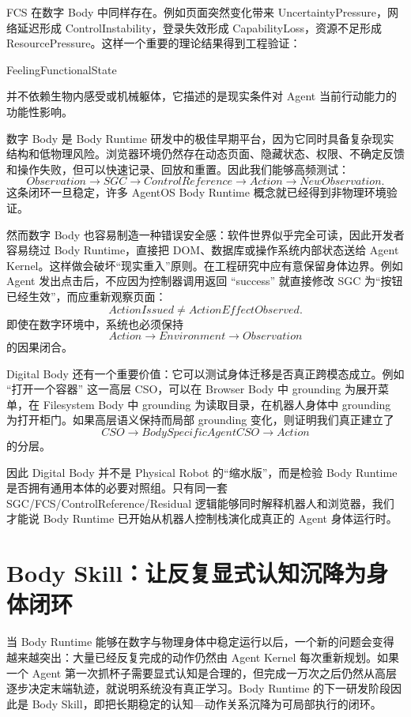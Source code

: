 FCS 在数字 Body 中同样存在。例如页面突然变化带来 UncertaintyPressure，网络延迟形成 ControlInstability，登录失效形成 CapabilityLoss，资源不足形成 ResourcePressure。这样一个重要的理论结果得到工程验证：
\begin{statementbox}
FeelingFunctionalState
\end{statementbox}
并不依赖生物内感受或机械躯体，它描述的是现实条件对 Agent 当前行动能力的功能性影响。

数字 Body 是 Body Runtime 研发中的极佳早期平台，因为它同时具备复杂现实结构和低物理风险。浏览器环境仍然存在动态页面、隐藏状态、权限、不确定反馈和操作失败，但可以快速记录、回放和重置。因此我们能够高频测试：
\[
Observation
\rightarrow
SGC
\rightarrow
ControlReference
\rightarrow
Action
\rightarrow
NewObservation.
\]
这条闭环一旦稳定，许多 AgentOS Body Runtime 概念就已经得到非物理环境验证。

然而数字 Body 也容易制造一种错误安全感：软件世界似乎完全可读，因此开发者容易绕过 Body Runtime，直接把 DOM、数据库或操作系统内部状态送给 Agent Kernel。这样做会破坏“现实重入”原则。在工程研究中应有意保留身体边界。例如 Agent 发出点击后，不应因为控制器调用返回 ``success'' 就直接修改 SGC 为“按钮已经生效”，而应重新观察页面：
\[
ActionIssued
\neq
ActionEffectObserved.
\]
即使在数字环境中，系统也必须保持
\[
Action
\rightarrow
Environment
\rightarrow
Observation
\]
的因果闭合。

Digital Body 还有一个重要价值：它可以测试身体迁移是否真正跨模态成立。例如 ``打开一个容器'' 这一高层 CSO，可以在 Browser Body 中 grounding 为展开菜单，在 Filesystem Body 中 grounding 为读取目录，在机器人身体中 grounding 为打开柜门。如果高层语义保持而局部 grounding 变化，则证明我们真正建立了
\[
CSO
\rightarrow
BodySpecificAgentCSO
\rightarrow
Action
\]
的分层。

因此 Digital Body 并不是 Physical Robot 的“缩水版”，而是检验 Body Runtime 是否拥有通用本体的必要对照组。只有同一套 SGC/FCS/ControlReference/Residual 逻辑能够同时解释机器人和浏览器，我们才能说 Body Runtime 已开始从机器人控制栈演化成真正的 Agent 身体运行时。

\section{Body Skill：让反复显式认知沉降为身体闭环}

当 Body Runtime 能够在数字与物理身体中稳定运行以后，一个新的问题会变得越来越突出：大量已经反复完成的动作仍然由 Agent Kernel 每次重新规划。如果一个 Agent 第一次抓杯子需要显式认知是合理的，但完成一万次之后仍然从高层逐步决定末端轨迹，就说明系统没有真正学习。Body Runtime 的下一研发阶段因此是 Body Skill，即把长期稳定的认知—动作关系沉降为可局部执行的闭环。

